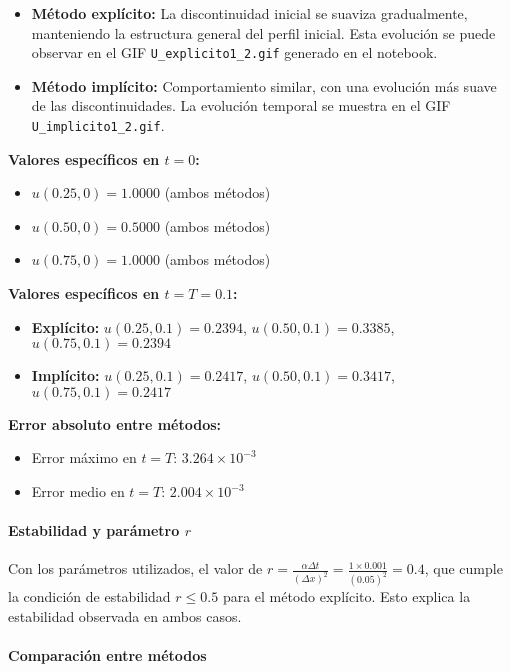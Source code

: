 \documentclass[12pt,a4paper]{article}
\begin{document}
\begin{itemize}
    \item \textbf{Método explícito:} La discontinuidad inicial se suaviza gradualmente, manteniendo la estructura general del perfil inicial. Esta evolución se puede observar en el GIF \texttt{U\_explicito1\_2.gif} generado en el notebook.
    \item \textbf{Método implícito:} Comportamiento similar, con una evolución más suave de las discontinuidades. La evolución temporal se muestra en el GIF \texttt{U\_implicito1\_2.gif}.
\end{itemize}

\textbf{Valores específicos en $t = 0$:}
\begin{itemize}
    \item $u(0.25, 0) = 1.0000$ (ambos métodos)
    \item $u(0.50, 0) = 0.5000$ (ambos métodos)
    \item $u(0.75, 0) = 1.0000$ (ambos métodos)
\end{itemize}

\textbf{Valores específicos en $t = T = 0.1$:}
\begin{itemize}
    \item \textbf{Explícito:} $u(0.25, 0.1) = 0.2394$, $u(0.50, 0.1) = 0.3385$, $u(0.75, 0.1) = 0.2394$
    \item \textbf{Implícito:} $u(0.25, 0.1) = 0.2417$, $u(0.50, 0.1) = 0.3417$, $u(0.75, 0.1) = 0.2417$
\end{itemize}

\textbf{Error absoluto entre métodos:}
\begin{itemize}
    \item Error máximo en $t = T$: $3.264 \times 10^{-3}$
    \item Error medio en $t = T$: $2.004 \times 10^{-3}$
\end{itemize}

\paragraph{Estabilidad y parámetro $r$}

Con los parámetros utilizados, el valor de $r = \frac{\alpha \Delta t}{(\Delta x)^2} = \frac{1 \times 0.001}{(0.05)^2} = 0.4$, que cumple la condición de estabilidad $r \leq 0.5$ para el método explícito. Esto explica la estabilidad observada en ambos casos.

\paragraph{Comparación entre métodos}
\end{document}
